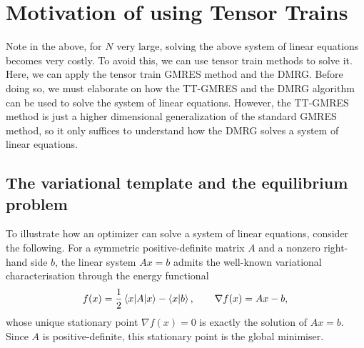 \documentclass[12pt]{article}
\theoremstyle{definition}
\theoremstyle{remark}
\begin{document}
\section{Motivation of using Tensor Trains}\label{sec:tt-motivation}
Note in the above, for $N$ very large, solving the above system of linear equations becomes very costly. To avoid this, we can use tensor train methods to solve it. Here, we can apply the tensor train GMRES method and the DMRG. Before doing so, we must elaborate on how the TT-GMRES and the DMRG algorithm can be used to solve the system of linear equations. However, the TT-GMRES method is just a higher dimensional generalization of the standard GMRES method, so it only suffices to understand how the DMRG solves a system of linear equations.

\subsection{The variational template and the equilibrium problem}\label{sec:variational}

To illustrate how an optimizer can solve a system of linear equations, consider the following. For a symmetric positive-definite matrix $A$ and a nonzero right-hand side $b$, the linear system $Ax = b$ admits the well-known variational characterisation through the energy functional
\[
f(x) = \frac{1}{2}\braket{x|A|x} - \braket{x|b}, \qquad \nabla f(x) = Ax - b,
\]
whose unique stationary point $\nabla f(x) = 0$ is exactly the solution of $Ax = b$. Since $A$ is positive-definite, this stationary point is the global minimiser.

\end{document}
